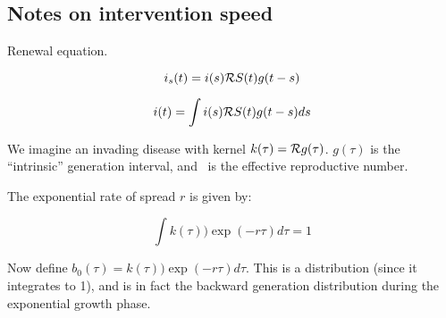 \documentclass[12pt]{article}
\begin{document}
\subsection*{Notes on intervention speed}

Renewal equation.

$$i_s(t) = i(s) {\cal R} S(t) g(t-s)$$

$$i(t) = \int{i(s) \ensuremath{{\cal R}}S(t) g(t-s)} ds$$

We imagine an invading disease with kernel $k(\tau) = {\cal R} g(\tau)$. 
$g(\tau)$ is the ``intrinsic'' generation interval, and \Rx\ is the effective reproductive number.

The exponential rate of spread $r$ is given by:

\begin{equation}
	\int{k(\tau)) \exp(-r\tau) d\tau} = 1
\end{equation}

Now define $b_0(\tau) = k(\tau)) \exp(-r\tau) d\tau$. This is a distribution (since it integrates to 1), and is in fact the backward generation distribution during the exponential growth phase.
\end{document}
